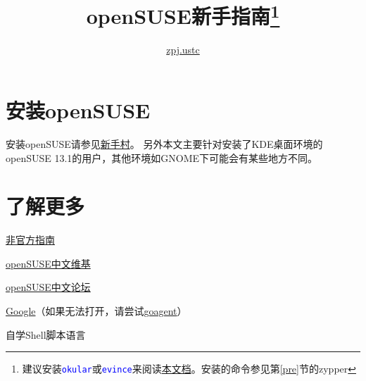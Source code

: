 \documentclass[11pt]{article}
\newcommand{\command}[1]{\texttt{\textcolor{blue}{#1}}}
\begin{document}
\title{openSUSE新手指南\thanks{建议安装\command{okular}或\command{evince}来阅读\href{https://jianguoyun.com/p/De3q8f4Q8-HjBRip_Qg}{本文档}。安装的命令参见第\ref{pre}节的zypper}}
\author{\href{mailto:zpj.ustc@gmail.com}{zpj.ustc}}
\date{}
\maketitle
\tableofcontents
\newpage
\section{安装openSUSE}
安装openSUSE请参见\href{https://zh.opensuse.org/%E6%96%B0%E6%89%8B%E6%9D%91}{新手村}。
另外本文主要针对安装了KDE桌面环境的openSUSE 13.1的用户，其他环境如GNOME下可能会有某些地方不同。
\section{了解更多}
\begin{compactitem}
 \item \href{https://lug.ustc.edu.cn/sites/opensuse-guide/}{非官方指南}
 \item \href{https://zh.opensuse.org/%E9%A6%96%E9%A1%B5}{openSUSE中文维基}
 \item \href{https://forum.suse.org.cn/}{openSUSE中文论坛}
 \item \href{https://google.com}{Google}（如果无法打开，请尝试\href{https://code.google.com/p/goagent/}{goagent}）
 \item 自学Shell脚本语言
\end{compactitem}
\end{document}
